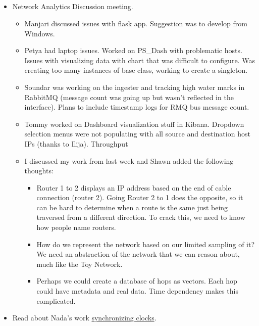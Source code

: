 \documentclass{weeklyreport}
\begin{document}
\subsection*{}

\begin{itemize}
    \item Network Analytics Discussion meeting.
    \begin{itemize}
    	\item Manjari discussed issues with flask app. Suggestion was to develop from Windows.
    	\item Petya had laptop issues. Worked on PS\_Dash with problematic hosts. Issues with visualizing data with chart that was difficult to configure. Was creating too many instances of base class, working to create a singleton.
    	\item Soundar was working on the ingester and tracking high water marks in RabbitMQ (message count was going up but wasn't reflected in the interface). Plans to include timestamp logs for RMQ bus message count.
    	\item Tommy worked on Dashboard visualization stuff in Kibana. Dropdown selection menus were not populating with all source and destination host IPs (thanks to Ilija). Throughput 
    	\item I discussed my work from last week and Shawn added the following thoughts:
    	\begin{itemize}
    	    \item Router 1 to 2 displays an IP address based on the end of cable connection (router 2). Going Router 2 to 1 does the opposite, so it can be hard to determine when a route is the same just being traversed from a different direction. To crack this, we need to know how people name routers.
    		\item How do we represent the network based on our limited sampling of it? We need an abstraction of the network that we can reason about, much like the Toy Network.
    		\item Perhaps we could create a database of hops as vectors. Each hop could have metadata and real data. Time dependency makes this complicated.
    	\end{itemize}
    \end{itemize}

    \item Read about Nada's work \href{https://docs.google.com/presentation/d/1HIrdwTaCa7Wkd2vGyN1xUlFuaAEpTP_CYZV5mBVHHWk/edit#slide=id.g8f9d31b3da_0_129}{synchronizing clocks}.
    

\end{itemize}
\end{document}
